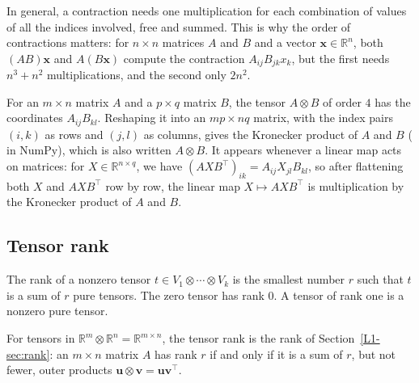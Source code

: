 In general, a contraction needs one multiplication for each combination of values of all the indices involved, free and summed. This is why the order of contractions matters: for $n \times n$ matrices $A$ and $B$ and a vector $\mathbf{x} \in \mathbb{R}^n$, both $(AB)\mathbf{x}$ and $A(B\mathbf{x})$ compute the contraction $A_{ij}B_{jk}x_k$, but the first needs $n^3 + n^2$ multiplications, and the second only $2n^2$.

\begin{remark}\label{L1-rem:kronecker}
    For an $m \times n$ matrix $A$ and a $p \times q$ matrix $B$, the tensor $A \otimes B$ of order $4$ has the coordinates $A_{ij}B_{kl}$. Reshaping it into an $mp \times nq$ matrix, with the index pairs $(i, k)$ as rows and $(j, l)$ as columns, gives the Kronecker product of $A$ and $B$ ( in NumPy), which is also written $A \otimes B$. It appears whenever a linear map acts on matrices: for $X \in \mathbb{R}^{n \times q}$, we have $(AXB^\top)_{ik} = A_{ij}X_{jl}B_{kl}$, so after flattening both $X$ and $AXB^\top$ row by row, the linear map $X \mapsto AXB^\top$ is multiplication by the Kronecker product of $A$ and $B$.
\end{remark}

\subsection{Tensor rank}

\begin{definition}\label{L1-def:tensor-rank}
    The rank of a nonzero tensor $t \in V_1 \otimes \cdots \otimes V_k$ is the smallest number $r$ such that $t$ is a sum of $r$ pure tensors. The zero tensor has rank $0$. A tensor of rank one is a nonzero pure tensor.
\end{definition}

\begin{proposition}\label{L1-prop:matrix-tensor-rank}
    For tensors in $\mathbb{R}^m \otimes \mathbb{R}^n = \mathbb{R}^{m \times n}$, the tensor rank is the rank of Section~\ref{L1-sec:rank}: an $m \times n$ matrix $A$ has rank $r$ if and only if it is a sum of $r$, but not fewer, outer products $\mathbf{u} \otimes \mathbf{v} = \mathbf{u}\mathbf{v}^\top$.
\end{proposition}

